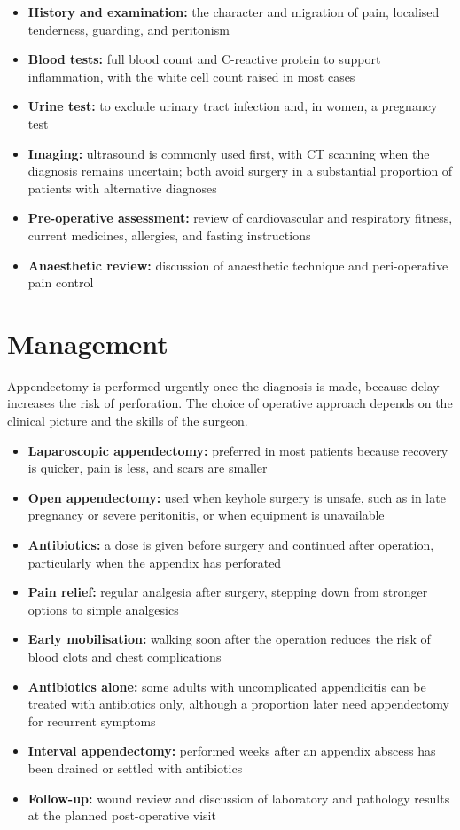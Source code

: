 \begin{itemize}
    \item \textbf{History and examination:} the character and migration of pain, localised tenderness, guarding, and peritonism
    \item \textbf{Blood tests:} full blood count and C-reactive protein to support inflammation, with the white cell count raised in most cases
    \item \textbf{Urine test:} to exclude urinary tract infection and, in women, a pregnancy test
    \item \textbf{Imaging:} ultrasound is commonly used first, with CT scanning when the diagnosis remains uncertain; both avoid surgery in a substantial proportion of patients with alternative diagnoses
    \item \textbf{Pre-operative assessment:} review of cardiovascular and respiratory fitness, current medicines, allergies, and fasting instructions
    \item \textbf{Anaesthetic review:} discussion of anaesthetic technique and peri-operative pain control
\end{itemize}

\section*{Management}
Appendectomy is performed urgently once the diagnosis is made, because delay increases the risk of perforation. The choice of operative approach depends on the clinical picture and the skills of the surgeon.

\begin{itemize}
    \item \textbf{Laparoscopic appendectomy:} preferred in most patients because recovery is quicker, pain is less, and scars are smaller
    \item \textbf{Open appendectomy:} used when keyhole surgery is unsafe, such as in late pregnancy or severe peritonitis, or when equipment is unavailable
    \item \textbf{Antibiotics:} a dose is given before surgery and continued after operation, particularly when the appendix has perforated
    \item \textbf{Pain relief:} regular analgesia after surgery, stepping down from stronger options to simple analgesics
    \item \textbf{Early mobilisation:} walking soon after the operation reduces the risk of blood clots and chest complications
    \item \textbf{Antibiotics alone:} some adults with uncomplicated appendicitis can be treated with antibiotics only, although a proportion later need appendectomy for recurrent symptoms
    \item \textbf{Interval appendectomy:} performed weeks after an appendix abscess has been drained or settled with antibiotics
    \item \textbf{Follow-up:} wound review and discussion of laboratory and pathology results at the planned post-operative visit
\end{itemize}

